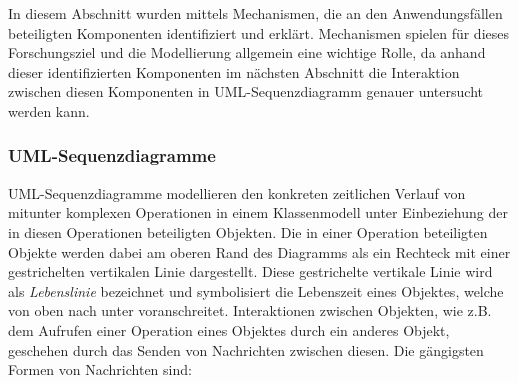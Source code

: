 
In diesem Abschnitt wurden mittels Mechanismen, die an den Anwendungsfällen beteiligten Komponenten identifiziert und erklärt.
Mechanismen spielen für dieses Forschungsziel und die Modellierung allgemein eine wichtige Rolle, da anhand dieser identifizierten Komponenten im nächsten Abschnitt die Interaktion zwischen diesen Komponenten in UML-Sequenzdiagramm genauer untersucht werden kann.

\FloatBarrier

\subsubsection{UML-Sequenzdiagramme}
\label{sec3:model:par:seq-use-cases}
UML-Sequenzdiagramme modellieren den konkreten zeitlichen Verlauf von mitunter komplexen Operationen in einem Klassenmodell unter Einbeziehung der in diesen Operationen beteiligten Objekten.
Die in einer Operation beteiligten Objekte werden dabei am oberen Rand des Diagramms als ein Rechteck mit einer gestrichelten vertikalen Linie dargestellt.
Diese gestrichelte vertikale Linie wird als \textit{Lebenslinie} bezeichnet und symbolisiert die Lebenszeit eines Objektes, welche von oben nach unter voranschreitet.
Interaktionen zwischen Objekten, wie z.B. dem Aufrufen einer Operation eines Objektes durch ein anderes Objekt, geschehen durch das Senden von Nachrichten zwischen diesen.
Die gängigsten Formen von Nachrichten sind:



